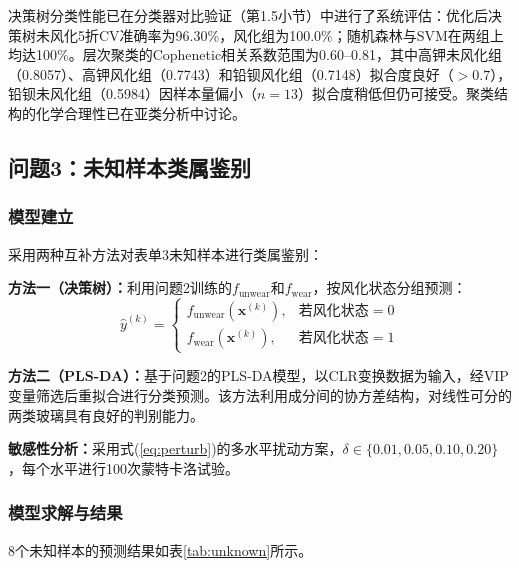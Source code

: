 \documentclass[12pt,a4paper]{ctexart}
\begin{document}
决策树分类性能已在分类器对比验证（第1.5小节）中进行了系统评估：优化后决策树未风化5折CV准确率为96.30\%，风化组为100.0\%；随机森林与SVM在两组上均达100\%。层次聚类的Cophenetic相关系数范围为0.60--0.81，其中高钾未风化组（0.8057）、高钾风化组（0.7743）和铅钡风化组（0.7148）拟合度良好（$>0.7$），铅钡未风化组（0.5984）因样本量偏小（$n=13$）拟合度稍低但仍可接受。聚类结构的化学合理性已在亚类分析中讨论。

\subsection{问题3：未知样本类属鉴别}

\subsubsection{模型建立}

采用两种互补方法对表单3未知样本进行类属鉴别：

\textbf{方法一（决策树）：}利用问题2训练的$f_{\text{unwear}}$和$f_{\text{wear}}$，按风化状态分组预测：
\begin{equation}
    \hat{y}^{(k)} = \begin{cases}
        f_{\text{unwear}}(\mathbf{x}^{(k)}), & \text{若风化状态}=0\\
        f_{\text{wear}}(\mathbf{x}^{(k)}), & \text{若风化状态}=1
    \end{cases}
    \label{eq:pred_tree}
\end{equation}

\textbf{方法二（PLS-DA）：}基于问题2的PLS-DA模型，以CLR变换数据为输入，经VIP变量筛选后重拟合进行分类预测。该方法利用成分间的协方差结构，对线性可分的两类玻璃具有良好的判别能力。

\textbf{敏感性分析：}采用式(\ref{eq:perturb})的多水平扰动方案，$\delta\in\{0.01,0.05,0.10,0.20\}$，每个水平进行100次蒙特卡洛试验。

\subsubsection{模型求解与结果}

8个未知样本的预测结果如表\ref{tab:unknown}所示。
\end{document}
